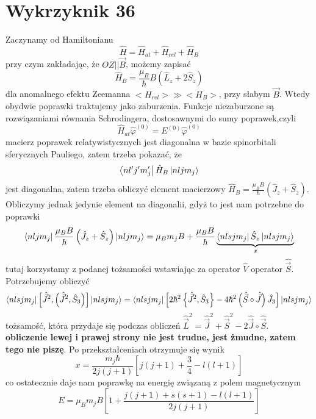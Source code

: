 \documentclass[a4paper,12pt]{article}
\begin{document}
\section{Wykrzyknik 36}
Zaczynamy od Hamiltonianu
$$
\hat{H}=\hat{H}_{at} + \hat{H}_{rel} + \hat{H}_B
$$
przy czym zakładając, że $OZ||\vec{B}$, możemy zapisać
$$
\hat{H}_B = \frac{\mu_B}{\hbar}B\left(\hat{L}_z + 2\hat{S}_z\right)
$$
dla anomalnego efektu Zeemanna $<H_{rel}> \gg <H_B>$, przy słabym $\vec{B}$. Wtedy 
obydwie poprawki traktujemy jako zaburzenia. Funkcje niezaburzone są rozwiązaniami równania Schrodingera, dostosawnymi do sumy poprawek,czyli
$$
\hat{H}_{at}\hat{\varphi}^{(0)} = E^{(0)}\hat{\varphi}^{(0)}
$$
macierz poprawek relatywistycznych jest diagonalna w bazie spinorbitali sferycznych Pauliego, zatem trzeba pokazać, że
$$
\bra{nl'j'm_j'}\hat{H}_B\ket{nljm_j}
$$
jest diagonalna, zatem trzeba obliczyć element macierzowy $\hat{H}_B = \frac{\mu_B B}{\hbar}\left(\hat{J}_z+\hat{S}_z \right)$. Obliczymy jednak jedynie element na diagonalii, gdyż to jest nam potrzebne do poprawki
$$
\begin{gathered}
\bra{nljm_j}\frac{\mu_B B}{\hbar}\left(\hat{J}_z+\hat{S}_z \right)\ket{nljm_j} = \mu_Bm_j B + \frac{\mu_B B}{\hbar}\underbrace{\bra{nlsjm_j}\hat{S}_z\ket{nlsjm_j}}_{x}
\end{gathered}
$$
tutaj korzystamy z podanej tożsamości wstawiając za operator $\hat{V}$ operator 
$\hat{\vec{S}}$. Potrzebujemy obliczyć
$$
\bra{nlsjm_j}\left[\hat{\vec{J}}^2,\left(\hat{\vec{J}}^2,\hat{S}_3\right)\right]\ket{nlsjm_j} = 
\bra{nlsjm_j}\left[ 2\hbar^2\left\{\hat{\vec{J}}^2,\hat{S}_3  \right\}-4\hbar^2\left(\hat{\vec{S}}\circ\hat{\vec{J}}\right)\hat{J}_3\right] \ket{nlsjm_j} 
$$
tożsamość, która przydaje się podczas obliczeń $\hat{\vec{L}}^2 = \hat{\vec{J}}^2+\hat{\vec{S}}^2- 2 \hat{\vec{J}}\circ\hat{\vec{S}}$.\\
\textbf{obliczenie lewej i prawej strony nie jest trudne, jest żmudne, zatem tego nie piszę}.
Po przekształceniach otrzymuje się wynik
$$
 x =\frac{m_j \hbar}{2j(j+1)}\left[j(j+1)+\frac{3}{4}-l(l+1)\right]
$$
co ostatecznie daje nam poprawkę na energię związaną z polem magnetycznym
$$
E = \mu_B m_j B \left[ 1+\frac{j(j+1) +s(s+1)-l(l+1)}{2j(j+1)}  \right]
$$
\end{document}
